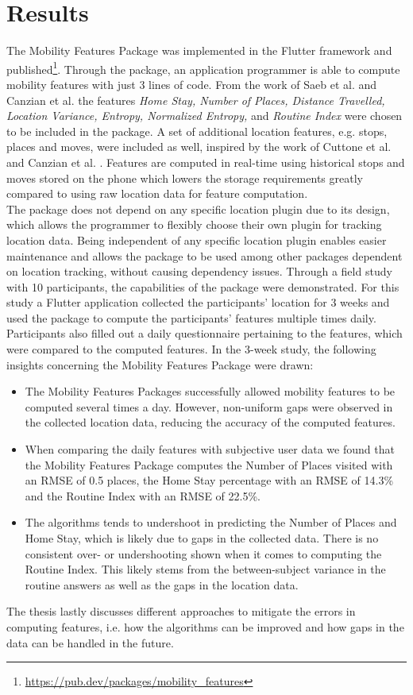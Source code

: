 \section{Results}
The Mobility Features Package was implemented in the Flutter framework and published\footnote{\url{https://pub.dev/packages/mobility_features}}. Through the package, an application programmer is able to compute mobility features with just 3 lines of code. From the work of Saeb et al. \cite{Saeb2015} and Canzian et al. \cite{Canzian2015} the features \textit{Home Stay, Number of Places, Distance Travelled, Location Variance, Entropy, Normalized Entropy,} and \textit{Routine Index} were chosen to be included in the package. A set of additional location features, e.g. stops, places and moves, were included as well, inspired by the work of Cuttone et al. \cite{sparse-location-2014} and Canzian et al. \cite{Canzian2015}. Features are computed in real-time using historical stops and moves stored on the phone which lowers the storage requirements greatly compared to using raw location data for feature computation.\\

The package does not depend on any specific location plugin due to its design, which allows the programmer to flexibly choose their own plugin for tracking location data. Being independent of any specific location plugin enables easier maintenance and allows the package to be used among other packages dependent on location tracking, without causing dependency issues. Through a field study with 10 participants, the capabilities of the package were demonstrated. For this study a Flutter application collected the participants' location for 3 weeks and used the package to compute the participants' features multiple times daily. Participants also filled out a daily questionnaire pertaining to the features, which were compared to the computed features. In the 3-week study, the following insights concerning the Mobility Features Package were drawn:

\begin{itemize}
    \item The Mobility Features Packages successfully allowed mobility features to be computed several times a day. However, non-uniform gaps were observed in the collected location data, reducing the accuracy of the computed features. 
    
    \item When comparing the daily features with subjective user data we found that the Mobility Features Package computes the Number of Places visited with an RMSE of 0.5 places, the Home Stay percentage with an RMSE of 14.3\% and the Routine Index with an RMSE of 22.5\%.
    
    \item The algorithms tends to undershoot in predicting the Number of Places and Home Stay, which is likely due to gaps in the collected data. There is no consistent over- or undershooting shown when it comes to computing the Routine Index. This likely stems from the between-subject variance in the routine answers as well as the gaps in the location data.
\end{itemize}

The thesis lastly discusses different approaches to mitigate the errors in computing features, i.e. how the algorithms can be improved and how gaps in the data can be handled in the future. 